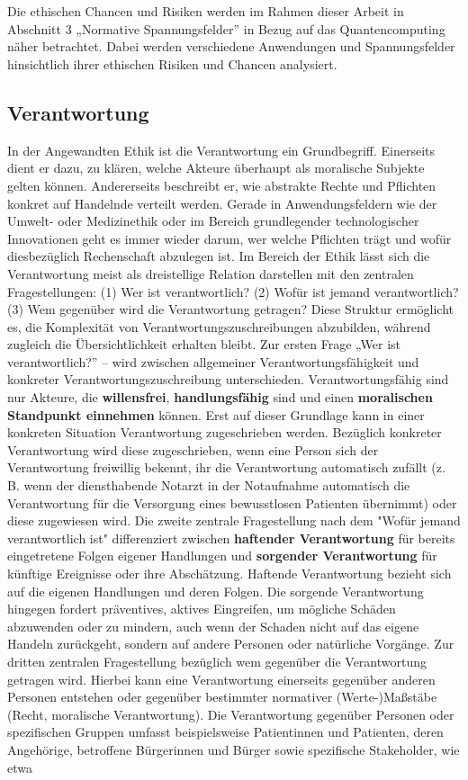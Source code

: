 \\
\\
Die ethischen Chancen und Risiken werden im Rahmen dieser Arbeit in Abschnitt 3 „Normative Spannungsfelder” in Bezug auf das Quantencomputing näher betrachtet. Dabei werden verschiedene Anwendungen und Spannungsfelder hinsichtlich ihrer ethischen Risiken und Chancen analysiert.


\subsection{Verantwortung}
In der Angewandten Ethik ist die Verantwortung ein Grundbegriff. Einerseits dient er dazu, zu klären, welche Akteure überhaupt als moralische Subjekte gelten können. Andererseits beschreibt er, wie abstrakte Rechte und Pflichten konkret auf Handelnde verteilt werden. Gerade in Anwendungsfeldern wie der Umwelt- oder Medizinethik oder im Bereich grundlegender technologischer Innovationen geht es immer wieder darum, wer welche Pflichten trägt und wofür diesbezüglich Rechenschaft abzulegen ist. Im Bereich der Ethik lässt sich die Verantwortung meist als dreistellige Relation darstellen mit den zentralen Fragestellungen: (1) Wer ist verantwortlich? (2) Wofür ist jemand verantwortlich? (3) Wem gegenüber wird die Verantwortung getragen? Diese Struktur ermöglicht es, die Komplexität von Verantwortungszuschreibungen abzubilden, während zugleich die Übersichtlichkeit erhalten bleibt. Zur ersten Frage „Wer ist verantwortlich?” – wird zwischen allgemeiner Verantwortungsfähigkeit und konkreter Verantwortungszuschreibung unterschieden. Verantwortungsfähig sind nur Akteure, die \textbf{willensfrei}, \textbf{handlungsfähig} sind und einen \textbf{moralischen Standpunkt einnehmen} können. Erst auf dieser Grundlage kann in einer konkreten Situation Verantwortung zugeschrieben werden. Bezüglich konkreter Verantwortung wird diese zugeschrieben, wenn eine Person sich der Verantwortung freiwillig bekennt, ihr die Verantwortung automatisch zufällt (z. B. wenn der diensthabende Notarzt in der Notaufnahme automatisch die Verantwortung für die Versorgung eines bewusstlosen Patienten übernimmt) oder diese zugewiesen wird. Die zweite zentrale Fragestellung nach dem "Wofür jemand verantwortlich ist" differenziert zwischen \textbf{haftender Verantwortung} für bereits eingetretene Folgen eigener Handlungen und \textbf{sorgender Verantwortung} für künftige Ereignisse oder ihre Abschätzung. Haftende Verantwortung bezieht sich auf die eigenen Handlungen und deren Folgen. Die sorgende Verantwortung hingegen fordert präventives, aktives Eingreifen, um mögliche Schäden abzuwenden oder zu mindern, auch wenn der Schaden nicht auf das eigene Handeln zurückgeht, sondern auf andere Personen oder natürliche Vorgänge. Zur dritten zentralen Fragestellung bezüglich wem gegenüber die Verantwortung getragen wird. Hierbei kann eine Verantwortung einerseits gegenüber anderen Personen entstehen oder gegenüber bestimmter normativer (Werte-)Maßstäbe (Recht, moralische Verantwortung). Die Verantwortung gegenüber Personen oder spezifischen Gruppen umfasst beispielsweise Patientinnen und Patienten, deren Angehörige, betroffene Bürgerinnen und Bürger sowie spezifische Stakeholder, wie etwa 